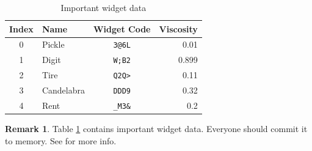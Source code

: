 \documentclass[11pt]{article}
\theoremstyle{definition}
\newtheorem*{remark}{Remark}
\begin{document}
\begin{table}[h]
    \centering
    \begin{tabular}{|c||l|c|||r|} 
        \hline
        Index & Name & Widget Code & Viscosity \\
        \hline
        0 & Pickle & \texttt{3@6L} & 0.01\\
        1 & Digit & \texttt{W;B2} & 0.899\\
        2 & Tire & \texttt{Q2Q>} & 0.11\\
        3 & Candelabra & \texttt{DDD9} & 0.32\\
        4 & Rent & \texttt{\_M3\&} & 0.2\\
        \hline
    \end{tabular}
    \caption{Important widget data}
    \label{table: my important widget data}
\end{table}

\begin{remark}
    Table \ref{table: my important widget data} contains important widget data. Everyone should commit it to memory.
    See \cite{JK25} for more info.
\end{remark}
\end{document}
